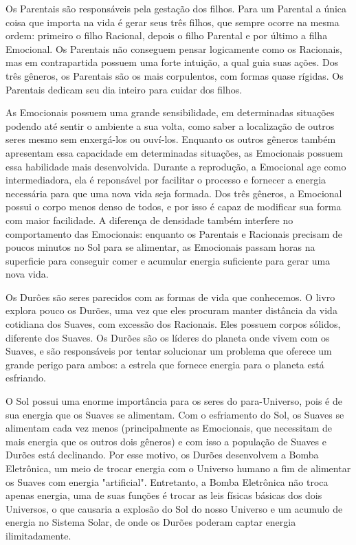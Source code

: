 \documentclass[14pt,portuguese]{extreport}
\begin{document}
      Os Parentais são responsáveis pela gestação dos filhos. Para um Parental a única coisa que importa na vida é
      gerar seus três filhos, que sempre ocorre na mesma ordem: primeiro o filho Racional, depois o filho Parental e por último
      a filha Emocional. Os Parentais não conseguem pensar logicamente como os Racionais, mas em contrapartida possuem uma
      forte intuição, a qual guia suas ações. Dos três gêneros, os Parentais são os mais corpulentos, com formas quase rígidas.
      Os Parentais dedicam seu dia inteiro para cuidar dos filhos.
      
      As Emocionais possuem uma grande sensibilidade, em determinadas situações podendo até sentir o ambiente a sua volta, como
      saber a localização de outros seres mesmo sem enxergá-los ou ouví-los. Enquanto os outros gêneros também apresentam essa
      capacidade em determinadas situações, as Emocionais possuem essa habilidade mais desenvolvida. Durante a reprodução,
      a Emocional age como intermediadora, ela é reponsável por facilitar o processo e fornecer a energia necessária para que uma
      nova vida seja formada. Dos três gêneros, a Emocional possui o corpo menos denso de todos, e por isso é capaz de modificar sua
      forma com maior facilidade. A diferença de densidade também interfere no comportamento das Emocionais: enquanto os Parentais e
      Racionais precisam de poucos minutos no Sol para se alimentar, as Emocionais passam horas na superficie para conseguir comer
      e acumular energia suficiente para gerar uma nova vida.
      
      Os Durôes são seres parecidos com as formas de vida que conhecemos. O livro explora pouco os Durões, uma vez que eles procuram
      manter distância da vida cotidiana dos Suaves, com excessão dos Racionais. Eles possuem corpos sólidos, diferente dos Suaves.
      Os Durões são os líderes do planeta onde vivem com os Suaves, e são responsáveis por tentar solucionar um problema que oferece
      um grande perigo para ambos: a estrela que fornece energia para o planeta está esfriando.
      
      O Sol possui uma enorme importância para os seres do para-Universo, pois é de sua energia que os Suaves se alimentam. Com o esfriamento
      do Sol, os Suaves se alimentam cada vez menos (principalmente as Emocionais, que necessitam de mais energia que os outros dois gêneros) e
      com isso a população de Suaves e Durões está declinando. Por esse motivo, os Durões desenvolvem a Bomba Eletrônica, um meio de trocar energia
      com o Universo humano a fim de alimentar os Suaves com energia "artificial". Entretanto, a Bomba Eletrônica não troca apenas energia, uma de suas
      funções é trocar as leis físicas básicas dos dois Universos, o que causaria a explosão do Sol do nosso Universo e um acumulo de energia no Sistema
      Solar, de onde os Durões poderam captar energia ilimitadamente.
      
\end{document}
